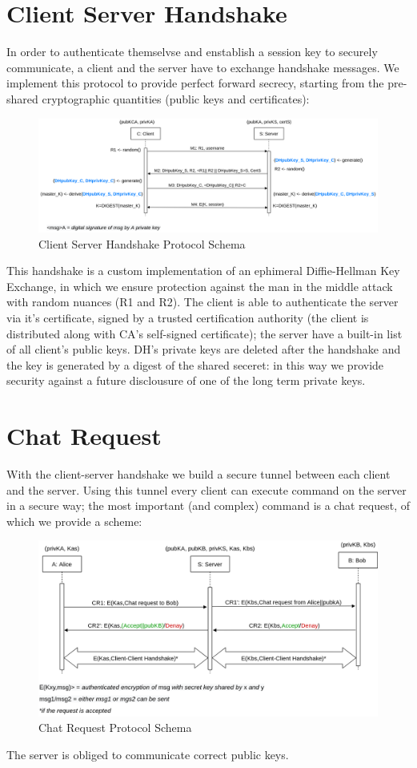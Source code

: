\documentclass[11pt]{report}
\begin{document}
\section{Client Server Handshake}
In order to authenticate themselvse and enstablish a session key to securely communicate, a client
and the server have to exchange handshake messages. We implement this protocol to provide perfect 
forward secrecy, starting from the pre-shared cryptographic quantities (public keys and certificates):
\begin{figure}[H]
	\centering
	\includegraphics[scale=0.19]{img/AuthClientServer.png}
	\caption{Client Server Handshake Protocol Schema}
	\label {img: AuthClientServer}
\end{figure}
This handshake is a custom implementation of an ephimeral Diffie-Hellman Key Exchange, in which we ensure
protection against the man in the middle attack with random nuances (R1 and R2). The client is able to 
authenticate the server via it's certificate, signed by a trusted certification authority (the client
is distributed along with CA's self-signed certificate); the server have a built-in list of all client's
public keys. DH's private keys are deleted after the handshake and the key is generated by a digest of the 
shared seceret: in this way we provide security against a future disclousure of one of the long term private keys.

\newpage
\section{Chat Request}
With the client-server handshake we build a secure tunnel between each client and the server. Using this 
tunnel every client can execute command on the server in a secure way; the most important (and complex) command
is a chat request, of which we provide a scheme:
\begin{figure}[H]
	\centering
	\includegraphics[scale=0.2]{img/ChatRequest.png}
	\caption{Chat Request Protocol Schema}
	\label {img: ChatRequest}
\end{figure}
The server is obliged to communicate correct public keys.
\end{document}
